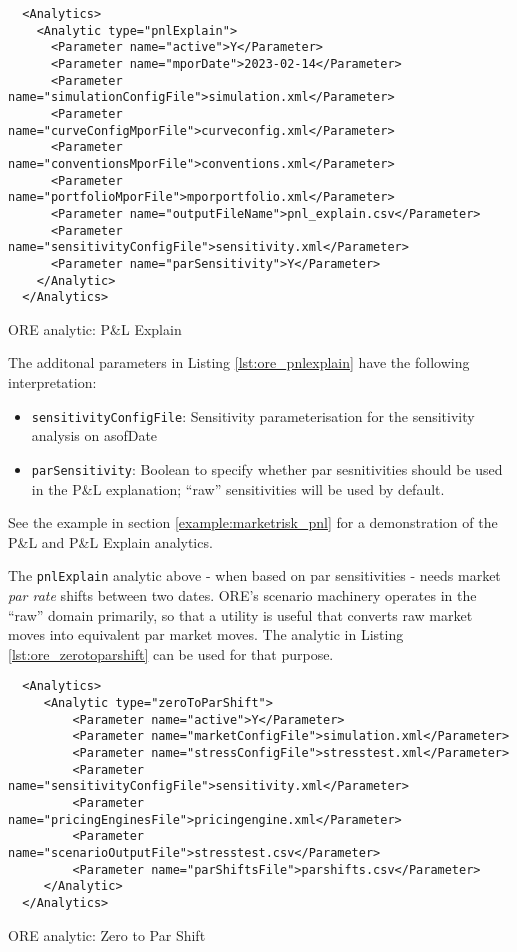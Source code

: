 {\begin{listing}[H]
\begin{verbatim}
  <Analytics>
    <Analytic type="pnlExplain">
      <Parameter name="active">Y</Parameter>
      <Parameter name="mporDate">2023-02-14</Parameter>
      <Parameter name="simulationConfigFile">simulation.xml</Parameter>
      <Parameter name="curveConfigMporFile">curveconfig.xml</Parameter>
      <Parameter name="conventionsMporFile">conventions.xml</Parameter>
      <Parameter name="portfolioMporFile">mporportfolio.xml</Parameter>
      <Parameter name="outputFileName">pnl_explain.csv</Parameter>
      <Parameter name="sensitivityConfigFile">sensitivity.xml</Parameter>
      <Parameter name="parSensitivity">Y</Parameter>	  
    </Analytic>
  </Analytics>
\end{verbatim}
\caption{ORE analytic: P\&L Explain}
\label{lst:ore_pnlexplain}
\end{listing}

The additonal parameters in Listing \ref{lst:ore_pnlexplain} have the following interpretation:

\begin{itemize}
\item {\tt sensitivityConfigFile}: Sensitivity parameterisation for the sensitivity analysis on asofDate
\item {\tt parSensitivity}: Boolean to specify whether par sesnitivities should be used in the P\&L explanation; ``raw'' sensitivities will be used by default.
\end{itemize}

See the example in section \ref{example:marketrisk_pnl} for a demonstration of the P\&L and P\&L Explain analytics.

\medskip
The {\tt pnlExplain} analytic above - when based on par sensitivities - needs market {\em par rate}
shifts between two dates. ORE's scenario machinery operates in the ``raw'' domain primarily, so that
a utility is useful that converts raw market moves into equivalent par market moves. The analytic
in Listing \ref{lst:ore_zerotoparshift} can be used for that purpose.

\begin{listing}[H]
\begin{verbatim}
  <Analytics>
     <Analytic type="zeroToParShift">
         <Parameter name="active">Y</Parameter>
         <Parameter name="marketConfigFile">simulation.xml</Parameter>
         <Parameter name="stressConfigFile">stresstest.xml</Parameter>
         <Parameter name="sensitivityConfigFile">sensitivity.xml</Parameter>
         <Parameter name="pricingEnginesFile">pricingengine.xml</Parameter>
         <Parameter name="scenarioOutputFile">stresstest.csv</Parameter>
         <Parameter name="parShiftsFile">parshifts.csv</Parameter>
     </Analytic>
  </Analytics>
\end{verbatim}
\caption{ORE analytic: Zero to Par Shift}
\label{lst:ore_zerotoparshift}
\end{listing}

}
